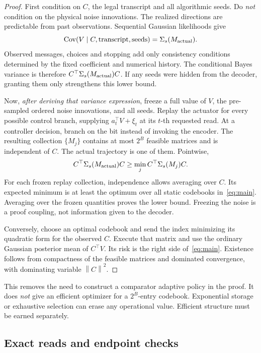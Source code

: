 \documentclass[11pt]{article}
\newcommand{\Cov}{\operatorname{Cov}}
\newcommand{\norm}[1]{\left\lVert#1\right\rVert}
\begin{document}
\begin{proof}
First condition on $C$, the legal transcript and all algorithmic seeds. Do \emph{not} condition on the physical noise innovations. The realized directions are predictable from past observations. Sequential Gaussian likelihoods give
\[
\Cov(V\mid C,\text{transcript},\text{seeds})
=\Sigma_s(M_{\rm actual}).
\]
Observed messages, choices and stopping add only consistency conditions determined by the fixed coefficient and numerical history. The conditional Bayes variance is therefore $C^\top\Sigma_s(M_{\rm actual})C$. If any seeds were hidden from the decoder, granting them only strengthens this lower bound.

Now, \emph{after deriving that variance expression}, freeze a full value of $V$, the pre-sampled ordered noise innovations, and all seeds. Replay the actuator for every possible control branch, supplying $a_t^\top V+\xi_t$ at its $t$-th requested read. At a controller decision, branch on the bit instead of invoking the encoder. The resulting collection $\{M_j\}$ contains at most $2^B$ feasible matrices and is independent of $C$. The actual trajectory is one of them. Pointwise,
\[
C^\top\Sigma_s(M_{\rm actual})C\ge\min_j C^\top\Sigma_s(M_j)C.
\]
For each frozen replay collection, independence allows averaging over $C$. Its expected minimum is at least the optimum over all static codebooks in~\eqref{eq:main}. Averaging over the frozen quantities proves the lower bound. Freezing the noise is a proof coupling, not information given to the decoder.

Conversely, choose an optimal codebook and send the index minimizing its quadratic form for the observed $C$. Execute that matrix and use the ordinary Gaussian posterior mean of $C^\top V$. Its risk is the right side of~\eqref{eq:main}. Existence follows from compactness of the feasible matrices and dominated convergence, with dominating variable $\norm{C}^2$.
\end{proof}

This removes the need to construct a comparator adaptive policy in the proof. It does \emph{not} give an efficient optimizer for a $2^B$-entry codebook. Exponential storage or exhaustive selection can erase any operational value. Efficient structure must be earned separately.

\subsection{Exact reads and endpoint checks}
\end{document}
